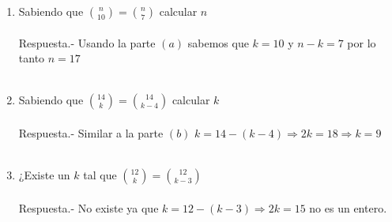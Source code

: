 \begin{enumerate}
\begin{enumerate}[\bfseries (a)]
\item Sabiendo que ${n \choose 10} = {n \choose 7}$ calcular $n$\\\\
Respuesta.- \;  Usando la parte $(a)$ sabemos que $k=10$ y $n-k=7$ por lo tanto $n=17$\\\\

\item Sabiendo que ${14 \choose k} = {14 \choose k - 4}$ calcular $k$\\\\ 
Respuesta.- \; Similar a la parte $(b)$ $k=14 - (k-4) \Rightarrow 2k=18 \Rightarrow k =9$\\\\

\item ¿Existe un $k$ tal que ${12 \choose k} = {12 \choose k-3}$\\\\
Respuesta.- \; No existe ya que $k=12 - (k-3) \Rightarrow 2k=15$ no es un entero.\\\\
\end{enumerate}


\end{enumerate}
